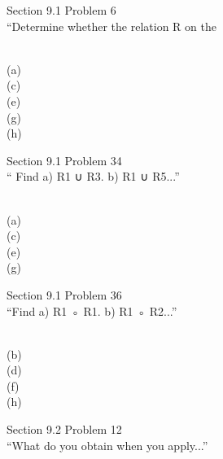 \documentclass[11pt]{exam}
\begin{document}
\begin{questions}
\begin{solution}
\end{solution}
\question[5.0] Section 9.1 Problem 6 \\
“Determine whether the relation R on the
\begin{solution}\\
(a)\\
(c)\\
(e)\\
(g)\\
(h)\\




\end{solution}
\question[4.0] Section 9.1 Problem 34 \\
“ Find a) R1 ∪ R3. b) R1 ∪ R5...”
\begin{solution}\\
(a)\\
(c)\\
(e)\\
(g)\\




\end{solution}
\question[4.0] Section 9.1 Problem 36 \\
“Find a) R1 ◦ R1. b) R1 ◦ R2...”
\begin{solution}\\
(b)\\
(d)\\
(f)\\
(h)\\




\end{solution}
\question[1.0] Section 9.2 Problem 12 \\
“What do you obtain when you apply...”
\begin{solution}\\




\end{solution}

\end{questions}
\end{document}
